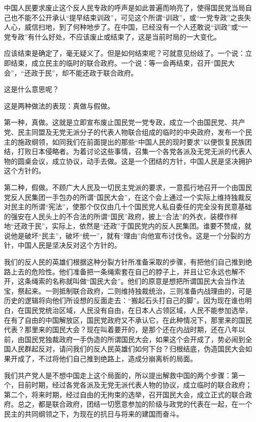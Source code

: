 中国人民要求废止这个反人民专政的呼声是如此普遍而响亮了，使得国民党当局自己也不能不公开承认“提早结束训政”，可见这个所谓“训政”，或“一党专政”之丧失人心，威信扫地，到了何种地步了。在中国，已经没有一个人还敢说“训政”或“一党专政”有什么好处，不应该废止或结束了，这是当前时局的一大变化。

应该结束是确定了，毫无疑义了。但是如何结束呢？可就意见纷歧了。一个说：立即结束，成立民主的临时的联合政府。一个说：等一会再结束，召开“国民大会”，“还政于民”，却不能还政于联合政府。

这是什么意思呢？

这是两种做法的表现：真做与假做。

第一种，真做。这就是立即宣布废止国民党一党专政，成立一个由国民党、共产党、民主同盟及无党无派分子的代表人物联合组成的临时的中央政府，发布一个民主的施政纲领，如同我们在前面提出的那些“中国人民的现时要求”以便恢复民族团结，打败日本侵略者。为着讨论这些事情，召集一个各党各派及无党无派的代表人物的圆桌会议，成立协议，动手去做。这是一个团结的方针，中国人民是坚决拥护这个方针的。

第二种，假做。不顾广大人民及一切民主党派的要求，一意孤行地召开一个由国民党反人民集团一手包办的所谓“国民大会”，在这个会上通过一个实际上维持独裁反对民主的所谓“宪法”，使那个仅仅由几十个国民党人私自委任的完全没有民意基础的强安在人民头上的不合法的所谓“国民”政府，披上“合法”的外衣，装模作样地“还政于民”，实际上，依然是“还政”于国民党内的反人民集团。谁要不赞成，就说他是破坏“民主”，破坏“统一”，就有“理由”向他宣布讨伐令。这是一个分裂的方针，中国人民是坚决反对这个方针的。

我们的反人民的英雄们根据这种分裂方针所准备采取的步骤，有把他们自己推到绝路上去的危险性。他们准备把一条绳索套在自己的脖子上，并且让它永远也解不开，这条绳索的名称就叫做“国民大会”。他们的原意是想把所谓国民大会当作法宝，祭起来。一则抵制联合政府，二则维持独裁统治，三则准备内战理由的，可是历史的逻辑将向他们所设想的反面走去：“搬起石头打自己的脚”。因为现在谁也明白，在国民党统治区域，人民没有自由，在日本人占领区域，人民不能参加选举，在有了自由的中国解放区，国民党政府又不承认它，在此种情况下，那里来的国民代表？那里来的国民大会？现在叫着要开的，是那个还在内战时期，还在八年以前，由国民党独裁政府一手伪造的所谓国民大会，如果这个会开成了，势必闹到全国人民群起反对，请问我们的反人民英雄们如何下台？归根结底，伪造国民大会如果开成了，不过将他们自己推到绝路上，造成分崩离析的局面。

我们共产党人是不想中国走上这个局面的，所以提出解救中国的两个步骤：第一个，目前时期，经过各党各派及无党无派代表人物的协议，成立临时的联合政府；第二个，将来时期，经过自由的无拘束的选举，召开国民大会，成立正式的联合政府。总之，都是联合政府，团结一切愿意参加的阶级与政党的代表在一起，在一个民主的共同纲领之下，为现在的抗日与将来的建国而奋斗。

